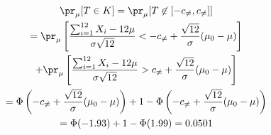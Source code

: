 \begin{example}
	\begin{gather*}
		\pr_\mu [T \in K] = \pr_\mu [T \not\in [-c_{\neq},c_{\neq}]] \\
		= \pr_\mu \left[ \frac{\sum_{i=1}^{12} X_i - 12 \mu}{\sigma \sqrt{12}} < -c_{\neq} + \frac{\sqrt{12}}{\sigma}
		(\mu_0 - \mu) \right] \\
		+ \pr_\mu \left[ \frac{\sum_{i=1}^{12} X_i - 12 \mu}{\sigma \sqrt{12}} > c_{\neq} +
		\frac{\sqrt{12}}{\sigma} (\mu_0 - \mu) \right]\\
		= \Phi \left( -c_{\neq} +  \frac{\sqrt{12}}{\sigma} (\mu_0 - \mu)\right) + 1 -\Phi \left( -c_{\neq} +
		\frac{\sqrt{12}}{\sigma} (\mu_0 - \mu)\right)\\
		= \Phi (-1.93) + 1 - \Phi (1.99) = 0.0501
	\end{gather*}
\end{example}
